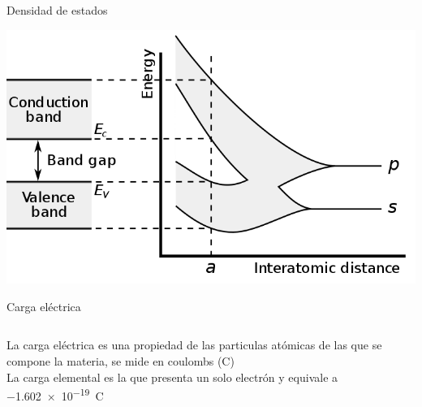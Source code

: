 \documentclass[aspectratio=169]{beamer}
\begin{document}
\begin{frame}{Densidad de estados}
    \begin{center}
        \includegraphics[width=0.7\linewidth]{fig/band_structure.png}
    \end{center}
\end{frame}

\begin{frame}{Carga eléctrica} 
    \begin{columns}[onlytextwidth]
    \begin{column}{0.6\textwidth}
        La carga eléctrica es una propiedad de las particulas atómicas de las que se compone la materia, se mide en coulombs (\si{\coulomb})\\[4pt]
        La carga elemental es la que presenta un solo electrón y equivale a \SI{-1.602e-19}{C}
    \end{column}
    \begin{column}{0.4\textwidth}
        \begin{center}
        \end{center}
    \end{column}
    \end{columns}
\end{frame}
\end{document}
